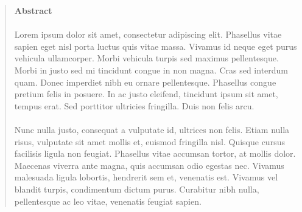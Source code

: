 \cleardoublepage{}

\thispagestyle{plain}

\hspace{3cm}

\begin{quote}

\begin{center}
  \textbf{Abstract}
\end{center}


\paragraph{}
Lorem ipsum dolor sit amet, consectetur adipiscing elit. Phasellus vitae sapien eget nisl porta luctus quis vitae massa. Vivamus id neque eget purus vehicula ullamcorper. Morbi vehicula turpis sed maximus pellentesque. Morbi in justo sed mi tincidunt congue in non magna. Cras sed interdum quam. Donec imperdiet nibh eu ornare pellentesque. Phasellus congue pretium felis in posuere. In ac justo eleifend, tincidunt ipsum sit amet, tempus erat. Sed porttitor ultricies fringilla. Duis non felis arcu.

\paragraph{}
Nunc nulla justo, consequat a vulputate id, ultrices non felis. Etiam nulla risus, vulputate sit amet mollis et, euismod fringilla nisl. Quisque cursus facilisis ligula non feugiat. Phasellus vitae accumsan tortor, at mollis dolor. Maecenas viverra ante magna, quis accumsan odio egestas nec. Vivamus malesuada ligula lobortis, hendrerit sem et, venenatis est. Vivamus vel blandit turpis, condimentum dictum purus. Curabitur nibh nulla, pellentesque ac leo vitae, venenatis feugiat sapien.

\end{quote}
